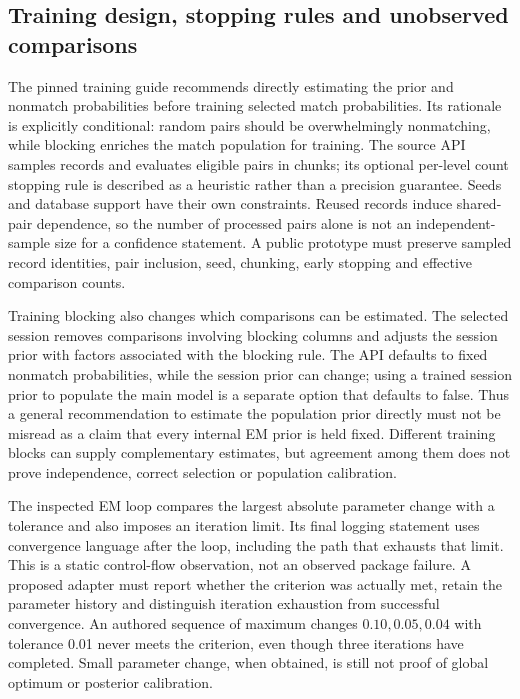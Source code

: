 \subsection{Training design, stopping rules and unobserved comparisons}
The pinned training guide recommends directly estimating the prior and nonmatch probabilities before training selected match probabilities. Its rationale is explicitly conditional: random pairs should be overwhelmingly nonmatching, while blocking enriches the match population for training. The source API samples records and evaluates eligible pairs in chunks; its optional per-level count stopping rule is described as a heuristic rather than a precision guarantee. Seeds and database support have their own constraints. Reused records induce shared-pair dependence, so the number of processed pairs alone is not an independent-sample size for a confidence statement. A public prototype must preserve sampled record identities, pair inclusion, seed, chunking, early stopping and effective comparison counts.\citep{exec24_splink_sources,exec24_splink_contract}

Training blocking also changes which comparisons can be estimated. The selected session removes comparisons involving blocking columns and adjusts the session prior with factors associated with the blocking rule. The API defaults to fixed nonmatch probabilities, while the session prior can change; using a trained session prior to populate the main model is a separate option that defaults to false. Thus a general recommendation to estimate the population prior directly must not be misread as a claim that every internal EM prior is held fixed. Different training blocks can supply complementary estimates, but agreement among them does not prove independence, correct selection or population calibration.\citep{exec24_splink_sources}

The inspected EM loop compares the largest absolute parameter change with a tolerance and also imposes an iteration limit. Its final logging statement uses convergence language after the loop, including the path that exhausts that limit. This is a static control-flow observation, not an observed package failure. A proposed adapter must report whether the criterion was actually met, retain the parameter history and distinguish iteration exhaustion from successful convergence. An authored sequence of maximum changes $0.10,0.05,0.04$ with tolerance 0.01 never meets the criterion, even though three iterations have completed. Small parameter change, when obtained, is still not proof of global optimum or posterior calibration.\citep{exec24_splink_sources,exec24_splink_contract}

